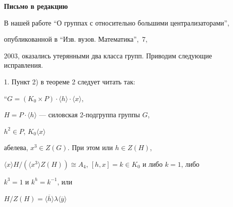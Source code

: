 




\newcommand{\ls}{\langle}


\newcommand{\ps}{\rangle}


\setcounter{page}{90}


\pagestyle{plain}








\vspace*{2cm}





\begin{center}


{\large\bf Письмо в редакцию}


\end{center}


\medskip





В нашей работе ``О группах с относительно большими централизаторами'',


опубликованной в ``Изв. вузов. Математика'', \No\,7,


2003, оказались утерянными два класса групп. Приводим следующие исправления.





1. Пункт 2) в теореме 2 следует читать так:





``$G=(K_0\times P)\cdot\ls h\ps\cdot\ls x\ps$,


$H=P\cdot\ls h\ps$ --- силовская 2-подгруппа группы $G$,


$h^2\in P$, $K_0\ls x\ps$ 


абелева, $x^3\in Z(G)$. При этом или $h\in Z(H)$,


$\ls x\ps H/(\ls x^3\ps Z(H))\cong A_4$, $[h,x]=k\in K_0$ и либо $k=1$, либо


$k^3=1$ и $k^h=k^{-1}$, или


$H/Z(H) = \ls\overline{h}\ps\lambda\ls\overline{y}\ps$


